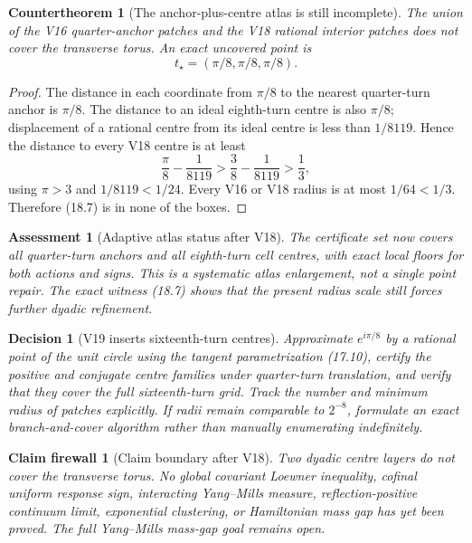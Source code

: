 \documentclass[11pt,oneside]{article}
\newtheorem{assessment}[theorem]{Assessment}
\newtheorem{firewall}[theorem]{Claim firewall}
\newtheorem{countertheorem}[theorem]{Countertheorem}
\newtheorem{decision}[theorem]{Decision}
\theoremstyle{definition}
\theoremstyle{remark}
\begin{document}
\begin{countertheorem}[The anchor-plus-centre atlas is still incomplete]
\label{ctr:newv18-no-cover}
The union of the V16 quarter-anchor patches and the V18 rational
interior patches does not cover the transverse torus.  An exact
uncovered point is
\[
 t_{\star}=(\pi/8,\pi/8,\pi/8).                           \tag{18.7}
\]
\end{countertheorem}

\begin{proof}
The distance in each coordinate from \(\pi/8\) to the nearest
quarter-turn anchor is \(\pi/8\).  The distance to an ideal
eighth-turn centre is also \(\pi/8\); displacement of a rational
centre from its ideal centre is less than \(1/8119\).  Hence the
distance to every V18 centre is at least
\[
 \frac{\pi}{8}-\frac1{8119}
 >\frac38-\frac1{8119}>\frac13,                           \tag{18.8}
\]
using \(\pi>3\) and \(1/8119<1/24\).  Every V16 or V18 radius is at
most \(1/64<1/3\).  Therefore (18.7) is in none of the boxes.
\end{proof}

\begin{assessment}[Adaptive atlas status after V18]
\label{ass:newv18}
The certificate set now covers all quarter-turn anchors and all
eighth-turn cell centres, with exact local floors for both actions
and signs.  This is a systematic atlas enlargement, not a single
point repair.  The exact witness (18.7) shows that the present radius
scale still forces further dyadic refinement.
\end{assessment}

\begin{decision}[V19 inserts sixteenth-turn centres]
\label{dec:newv18-next}
Approximate \(e^{i\pi/8}\) by a rational point of the unit circle
using the tangent parametrization (17.10), certify the positive and
conjugate centre families under quarter-turn translation, and verify
that they cover the full sixteenth-turn grid.  Track the number and
minimum radius of patches explicitly.  If radii remain comparable to
\(2^{-8}\), formulate an exact branch-and-cover algorithm rather than
manually enumerating indefinitely.
\end{decision}

\begin{firewall}[Claim boundary after V18]
\label{fire:newv18-final}
Two dyadic centre layers do not cover the transverse torus.  No
global covariant Loewner inequality, cofinal uniform response sign,
interacting Yang--Mills measure, reflection-positive continuum
limit, exponential clustering, or Hamiltonian mass gap has yet been
proved.  The full Yang--Mills mass-gap goal remains open.
\end{firewall}
\end{document}
